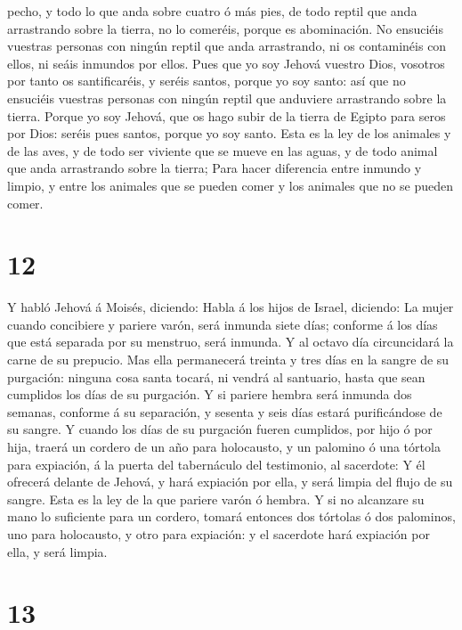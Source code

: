 pecho, y todo lo que anda sobre cuatro ó más pies, de todo reptil que
anda arrastrando sobre la tierra, no lo comeréis, porque es abominación.
 No ensuciéis vuestras personas con ningún reptil que
anda arrastrando, ni os contaminéis con ellos, ni seáis inmundos por
ellos.  Pues que yo soy Jehová vuestro Dios, vosotros por
tanto os santificaréis, y seréis santos, porque yo soy santo: así que no
ensuciéis vuestras personas con ningún reptil que anduviere arrastrando
sobre la tierra.  Porque yo soy Jehová, que os hago subir
de la tierra de Egipto para seros por Dios: seréis pues santos, porque
yo soy santo.  Esta es la ley de los animales y de las
aves, y de todo ser viviente que se mueve en las aguas, y de todo animal
que anda arrastrando sobre la tierra;  Para hacer
diferencia entre inmundo y limpio, y entre los animales que se pueden
comer y los animales que no se pueden comer.

\hypertarget{section-11}{%
\section{12}\label{section-11}}

 Y habló Jehová á Moisés, diciendo:  Habla á
los hijos de Israel, diciendo: La mujer cuando concibiere y pariere
varón, será inmunda siete días; conforme á los días que está separada
por su menstruo, será inmunda.  Y al octavo día
circuncidará la carne de su prepucio.  Mas ella
permanecerá treinta y tres días en la sangre de su purgación: ninguna
cosa santa tocará, ni vendrá al santuario, hasta que sean cumplidos los
días de su purgación.  Y si pariere hembra será inmunda
dos semanas, conforme á su separación, y sesenta y seis días estará
purificándose de su sangre.  Y cuando los días de su
purgación fueren cumplidos, por hijo ó por hija, traerá un cordero de un
año para holocausto, y un palomino ó una tórtola para expiación, á la
puerta del tabernáculo del testimonio, al sacerdote:  Y él
ofrecerá delante de Jehová, y hará expiación por ella, y será limpia del
flujo de su sangre. Esta es la ley de la que pariere varón ó hembra.
 Y si no alcanzare su mano lo suficiente para un cordero,
tomará entonces dos tórtolas ó dos palominos, uno para holocausto, y
otro para expiación: y el sacerdote hará expiación por ella, y será
limpia.

\hypertarget{section-12}{%
\section{13}\label{section-12}}

